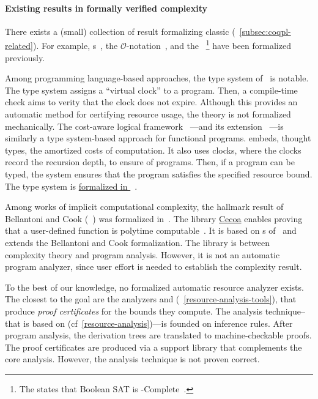 \paragraph*{Existing results in formally verified complexity}
There exists a (small) collection of result formalizing classic  (\cf~\autoref{subsec:coqpl-related}). For example, s~\cite{forster2020}, the
\(\mathcal{O}\)-notation~\cite{gueneau2018}, and the ~\cite{gaher2021}\footnote{The
 states that Boolean SAT is
-Complete~\cite{cook1971, levin1973}.} have been formalized
previously.

Among programming language-based approaches, the type system of~\cite{crary2000}
is notable. The type system assigns a \enquote{virtual clock} to a program.
Then, a compile-time check aims to verity that the clock does not expire.
Although this provides an automatic method for certifying resource usage, the
theory is not formalized mechanically. The cost-aware logical framework
~\cite{niu2022}---and its extension
~\cite{grodin2024}---is similarly a type system-based approach for
functional programs.   embeds, thought types, the amortized
costs of computation. It also uses clocks, where the clocks
record the recursion depth, to ensure  of programs. Then, if a
program can be typed, the  system ensures that the program satisfies
the specified resource bound. The type system is
\href{https://github.com/HarrisonGrodin/agda-calf}{formalized in
}~\cite{grodin2023}.

Among works of implicit computational complexity, the hallmark result of
Bellantoni and Cook (~) was formalized
in~\textcite{heraud2011}. The  library
\href{https://github.com/davidnowak/cecoa}{Cecoa}{} enables proving
that a user-defined function is polytime computable~\cite{feree2018}. It is
based on s of~\textcite{marion2000} and extends the
Bellantoni and Cook formalization. The  library is between complexity
theory and program analysis. However, it is not an automatic program analyzer,
since user effort is needed to establish the complexity result.

To the best of our knowledge, no formalized automatic resource analyzer exists.
The closest to the goal are the analyzers  and 
(\cf~\autoref{resource-analysis-tools}), that produce \emph{proof certificates}
for the bounds they compute. The analysis technique--that is based on
(cf~\autoref{resource-analysis})---is founded on inference rules. After program
analysis, the derivation trees are translated to machine-checkable proofs. The
proof certificates are produced via a support library that complements the core
analysis. However, the analysis {technique} is not proven correct.

